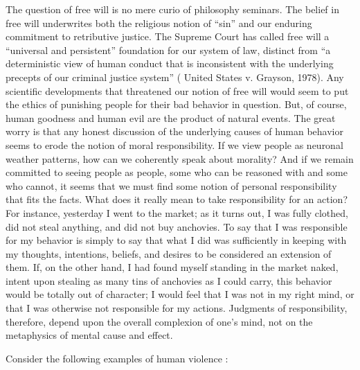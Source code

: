\documentclass[a4paper,14pt]{extarticle}
\begin{document}
The question of free will is no mere curio of philosophy seminars.
The belief in free will underwrites both the religious notion of ``sin'' and our enduring commitment to retributive justice.
The Supreme Court has called free will a ``universal and persistent'' foundation for our system of law, distinct from ``a deterministic view of human conduct that is inconsistent with the underlying precepts of our criminal justice system'' ( United States v. Grayson, 1978).
Any scientific developments that threatened our notion of free will would seem to put the ethics of punishing people for their bad behavior in question.
But, of course, human goodness and human evil are the product of natural events.
The great worry is that any honest discussion of the underlying causes of human behavior seems to erode the notion of moral responsibility.
If we view people as neuronal weather patterns, how can we coherently speak about morality?
And if we remain committed to seeing people as people, some who can be reasoned with and some who cannot, it seems that we must find some notion of personal responsibility that fits the facts.
What does it really mean to take responsibility for an action?
For instance, yesterday I went to the market;
as it turns out, I was fully clothed, did not steal anything, and did not buy anchovies.
To say that I was responsible for my behavior is simply to say that what I did was sufficiently in keeping with my thoughts, intentions, beliefs, and desires to be considered an extension of them.
If, on the other hand, I had found myself standing in the market naked, intent upon stealing as many tins of anchovies as I could carry, this behavior would be totally out of character;
I would feel that I was not in my right mind, or that I was otherwise not responsible for my actions.
Judgments of responsibility, therefore, depend upon the overall complexion of one’s mind, not on the metaphysics of mental cause and effect.

Consider the following examples of human violence :
\end{document}
